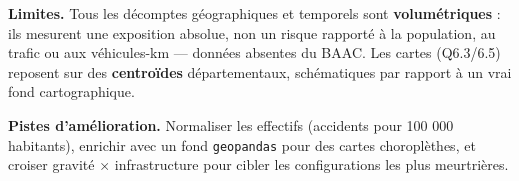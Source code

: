 \documentclass[11pt,a4paper]{article}
\begin{document}
\textbf{Limites.} Tous les décomptes géographiques et temporels sont \textbf{volumétriques} : ils mesurent une exposition absolue, non un risque rapporté à la population, au trafic ou aux véhicules-km — données absentes du BAAC. Les cartes (Q6.3/6.5) reposent sur des \textbf{centroïdes} départementaux, schématiques par rapport à un vrai fond cartographique.

\textbf{Pistes d'amélioration.} Normaliser les effectifs (accidents pour 100 000 habitants), enrichir avec un fond \texttt{geopandas} pour des cartes choroplèthes, et croiser gravité × infrastructure pour cibler les configurations les plus meurtrières.
\end{document}
